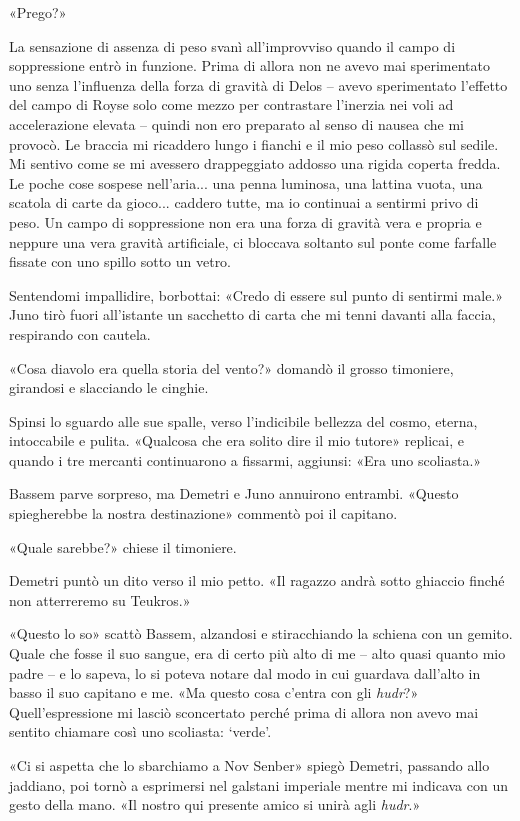 «Prego?»

La sensazione di assenza di peso svanì all'improvviso quando il campo di
soppressione entrò in funzione. Prima di allora non ne avevo mai
sperimentato uno senza l'influenza della forza di gravità di Delos --
avevo sperimentato l'effetto del campo di Royse solo come mezzo per
contrastare l'inerzia nei voli ad accelerazione elevata -- quindi non
ero preparato al senso di nausea che mi provocò. Le braccia mi ricaddero
lungo i fianchi e il mio peso collassò sul sedile. Mi sentivo come se mi
avessero drappeggiato addosso una rigida coperta fredda. Le poche cose
sospese nell'aria... una penna luminosa, una lattina vuota, una scatola
di carte da gioco... caddero tutte, ma io continuai a sentirmi privo di
peso. Un campo di soppressione non era una forza di gravità vera e
propria e neppure una vera gravità artificiale, ci bloccava soltanto sul
ponte come farfalle fissate con uno spillo sotto un vetro.

Sentendomi impallidire, borbottai: «Credo di essere sul punto di
sentirmi male.» Juno tirò fuori all'istante un sacchetto di carta che mi
tenni davanti alla faccia, respirando con cautela.

«Cosa diavolo era quella storia del vento?» domandò il grosso timoniere,
girandosi e slacciando le cinghie.

Spinsi lo sguardo alle sue spalle, verso l'indicibile bellezza del
cosmo, eterna, intoccabile e pulita. «Qualcosa che era solito dire il
mio tutore» replicai, e quando i tre mercanti continuarono a fissarmi,
aggiunsi: «Era uno scoliasta.»

Bassem parve sorpreso, ma Demetri e Juno annuirono entrambi. «Questo
spiegherebbe la nostra destinazione» commentò poi il capitano.

«Quale sarebbe?» chiese il timoniere.

Demetri puntò un dito verso il mio petto. «Il ragazzo andrà sotto
ghiaccio finché non atterreremo su Teukros.»

«Questo lo so» scattò Bassem, alzandosi e stiracchiando la schiena con
un gemito. Quale che fosse il suo sangue, era di certo più alto di me --
alto quasi quanto mio padre -- e lo sapeva, lo si poteva notare dal modo
in cui guardava dall'alto in basso il suo capitano e me. «Ma questo cosa
c'entra con gli \emph{hudr}?» Quell'espressione mi lasciò sconcertato
perché prima di allora non avevo mai sentito chiamare così uno
scoliasta: `verde'.

«Ci si aspetta che lo sbarchiamo a Nov Senber» spiegò Demetri, passando
allo jaddiano, poi tornò a esprimersi nel galstani imperiale mentre mi
indicava con un gesto della mano. «Il nostro qui presente amico si unirà
agli \emph{hudr}.»

